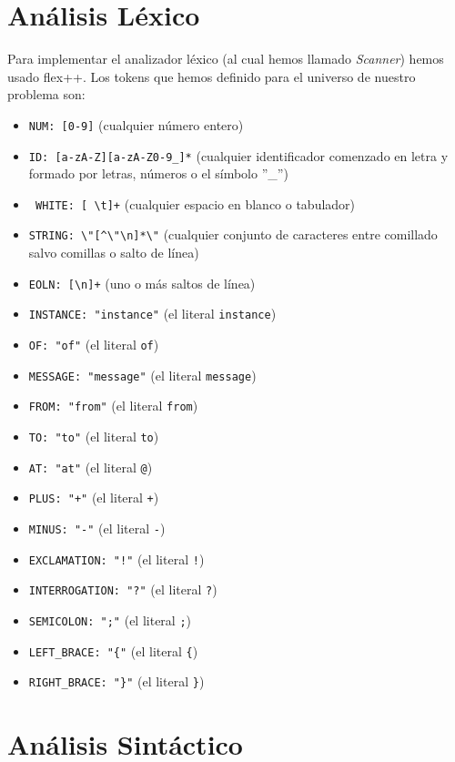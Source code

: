 \section{Análisis Léxico}
Para implementar el analizador léxico (al cual hemos llamado
\textit{Scanner}) hemos usado flex++. Los tokens que hemos definido
para el universo de nuestro problema son:

\lstset{language=C,style=code}

\begin{itemize}
\item \lstinline{NUM: [0-9]} (cualquier número entero)
\item \lstinline{ID: [a-zA-Z][a-zA-Z0-9_]*} (cualquier identificador
  comenzado  en letra y formado por letras, números o el símbolo ''\_'')
\item\lstinline{ WHITE: [ \t]+} (cualquier espacio en blanco o tabulador)
\item \lstinline{STRING: \"[^\"\n]*\"} (cualquier conjunto de caracteres entre
  comillado salvo comillas o salto de línea)
\item \lstinline{EOLN: [\n]+} (uno o más saltos de línea)
\item \lstinline{INSTANCE: "instance"} (el literal \lstinline{instance})
\item \lstinline{OF: "of"} (el literal \lstinline{of})
\item \lstinline{MESSAGE: "message"} (el literal \lstinline{message})
\item \lstinline{FROM: "from"} (el literal \lstinline{from})
\item \lstinline{TO: "to"} (el literal \lstinline{to})
\item \lstinline{AT: "at"} (el literal \lstinline{@})
\item \lstinline{PLUS: "+"} (el literal \lstinline{+})
\item \lstinline{MINUS: "-"} (el literal \lstinline{-})
\item \lstinline{EXCLAMATION: "!"} (el literal \lstinline{!})
\item \lstinline{INTERROGATION: "?"} (el literal \lstinline{?})
\item \lstinline{SEMICOLON: ";"} (el literal \lstinline{;})
\item \lstinline!LEFT_BRACE: "{"! (el literal \lstinline!{!)
\item \lstinline!RIGHT_BRACE: "}"! (el literal \lstinline!}!)
\end{itemize}

\section{Análisis Sintáctico}

